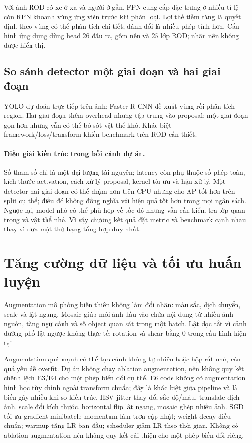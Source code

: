 \documentclass[12pt,a4paper,oneside]{report}
\begin{document}
Với ảnh ROD có xe ở xa và người ở gần, FPN cung cấp đặc trưng ở nhiều tỉ lệ còn RPN khoanh vùng ứng viên trước khi phân loại. Lợi thế tiềm tàng là quyết định theo vùng có thể phân tích chi tiết; đánh đổi là nhiều phép tính hơn. Cấu hình ứng dụng dùng head 26 đầu ra, gồm nền và 25 lớp ROD; nhãn nền không được hiển thị. 


\subsection{So sánh detector một giai đoạn và hai giai đoạn}
YOLO dự đoán trực tiếp trên ảnh; Faster R-CNN đề xuất vùng rồi phân tích region. Hai giai đoạn thêm overhead nhưng tập trung vào proposal; một giai đoạn gọn hơn nhưng vẫn có thể bỏ sót vật thể khó. Khác biệt framework/loss/transform khiến benchmark trên ROD cần thiết.

\paragraph{Diễn giải kiến trúc trong bối cảnh dự án.}
Số tham số chỉ là một đại lượng tài nguyên; latency còn phụ thuộc số phép toán, kích thước activation, cách xử lý proposal, kernel tối ưu và hậu xử lý. Một detector hai giai đoạn có thể chậm hơn trên CPU nhưng cho AP tốt hơn trên split cụ thể; điều đó không đồng nghĩa với hiệu quả tốt hơn trong mọi ngân sách. Ngược lại, model nhỏ có thể phù hợp về tốc độ nhưng vẫn cần kiểm tra lớp quan trọng và vật thể nhỏ. Vì vậy chương kết quả đặt metric và benchmark cạnh nhau thay vì đưa một thứ hạng tổng hợp duy nhất.

\section{Tăng cường dữ liệu và tối ưu huấn luyện}
Augmentation mô phỏng biến thiên không làm đổi nhãn: màu sắc, dịch chuyển, scale và lật ngang. Mosaic giúp mỗi ảnh đầu vào chứa nội dung từ nhiều ảnh nguồn, tăng ngữ cảnh và số object quan sát trong một batch. Lật dọc tắt vì cảnh đường phố lật ngược không thực tế; rotation và shear bằng 0 trong cấu hình hiện tại.

Augmentation quá mạnh có thể tạo cảnh không tự nhiên hoặc hộp rất nhỏ, còn quá yếu dễ overfit. Dự án không chạy ablation augmentation, nên không quy kết chênh lệch E3/E4 cho một phép biến đổi cụ thể. E6 code không có augmentation hình học tùy chỉnh ngoài transform chuẩn; đây là khác biệt giữa pipeline và là biến gây nhiễu khi so kiến trúc.
HSV jitter thay đổi sắc độ/màu, translate dịch ảnh, scale đổi kích thước, horizontal flip lật ngang, mosaic ghép nhiều ảnh. SGD tối ưu gradient minibatch; momentum làm trơn cập nhật; weight decay điều chuẩn; warmup tăng LR ban đầu; scheduler giảm LR theo thời gian. Không có ablation augmentation nên không quy kết cải thiện cho một phép biến đổi riêng.
\end{document}
